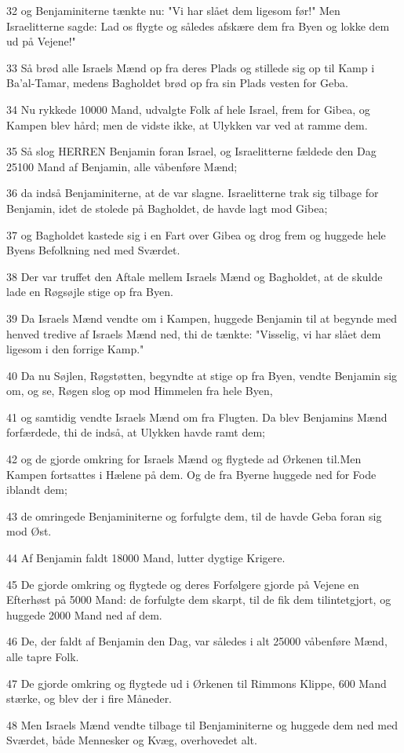 \par 32 og Benjaminiterne tænkte nu: "Vi har slået dem ligesom før!" Men Israelitterne sagde: Lad os flygte og således afskære dem fra Byen og lokke dem ud på Vejene!"
\par 33 Så brød alle Israels Mænd op fra deres Plads og stillede sig op til Kamp i Ba'al-Tamar, medens Bagholdet brød op fra sin Plads vesten for Geba.
\par 34 Nu rykkede 10000 Mand, udvalgte Folk af hele Israel, frem for Gibea, og Kampen blev hård; men de vidste ikke, at Ulykken var ved at ramme dem.
\par 35 Så slog HERREN Benjamin foran Israel, og Israelitterne fældede den Dag 25100 Mand af Benjamin, alle våbenføre Mænd;
\par 36 da indså Benjaminiterne, at de var slagne. Israelitterne trak sig tilbage for Benjamin, idet de stolede på Bagholdet, de havde lagt mod Gibea;
\par 37 og Bagholdet kastede sig i en Fart over Gibea og drog frem og huggede hele Byens Befolkning ned med Sværdet.
\par 38 Der var truffet den Aftale mellem Israels Mænd og Bagholdet, at de skulde lade en Røgsøjle stige op fra Byen.
\par 39 Da Israels Mænd vendte om i Kampen, huggede Benjamin til at begynde med henved tredive af Israels Mænd ned, thi de tænkte: "Visselig, vi har slået dem ligesom i den forrige Kamp."
\par 40 Da nu Søjlen, Røgstøtten, begyndte at stige op fra Byen, vendte Benjamin sig om, og se, Røgen slog op mod Himmelen fra hele Byen,
\par 41 og samtidig vendte Israels Mænd om fra Flugten. Da blev Benjamins Mænd forfærdede, thi de indså, at Ulykken havde ramt dem;
\par 42 og de gjorde omkring for Israels Mænd og flygtede ad Ørkenen til.Men Kampen fortsattes i Hælene på dem. Og de fra Byerne huggede ned for Fode iblandt dem;
\par 43 de omringede Benjaminiterne og forfulgte dem, til de havde Geba foran sig mod Øst.
\par 44 Af Benjamin faldt 18000 Mand, lutter dygtige Krigere.
\par 45 De gjorde omkring og flygtede og deres Forfølgere gjorde på Vejene en Efterhøst på 5000 Mand: de forfulgte dem skarpt, til de fik dem tilintetgjort, og huggede 2000 Mand ned af dem.
\par 46 De, der faldt af Benjamin den Dag, var således i alt 25000 våbenføre Mænd, alle tapre Folk.
\par 47 De gjorde omkring og flygtede ud i Ørkenen til Rimmons Klippe, 600 Mand stærke, og blev der i fire Måneder.
\par 48 Men Israels Mænd vendte tilbage til Benjaminiterne og huggede dem ned med Sværdet, både Mennesker og Kvæg, overhovedet alt.

